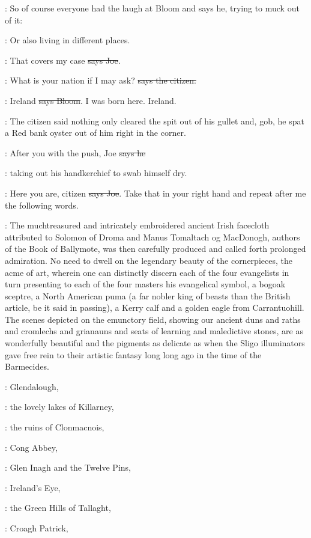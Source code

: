\Nq:
So of course everyone had the laugh at Bloom and says he, trying to
muck out of it:

\Bloom:
Or also living in different places.

\joe:
That covers my case \sout{says Joe}.

\citizen:
What is your nation if I may ask?
\sout{says the citizen.}

\Bloom:
Ireland \sout{says Bloom}.
I was born here. Ireland.

\Nq:
The citizen said nothing only cleared the spit out of his gullet and,
gob, he spat a Red bank oyster out of him right in the corner.

\citizen:
After you with the push, Joe \sout{says he}

\Nq:
taking out his handkerchief to
swab himself dry.

\joe:
Here you are, citizen \sout{says Joe}.
Take that in your right hand and repeat
after me the following words.

:
The muchtreasured and intricately embroidered ancient Irish
facecloth attributed to Solomon of Droma and Manus Tomaltach og
MacDonogh, authors of the Book of Ballymote,
was then carefully
produced and called forth prolonged admiration. No need to dwell on the
legendary beauty of the cornerpieces, the acme of art, wherein one can
distinctly discern each of the four evangelists in turn presenting to each
of the four masters his evangelical symbol, a bogoak sceptre, a North
American puma (a far nobler king of beasts than the British article, be it
said in passing), a Kerry calf and a golden eagle from Carrantuohill. The
scenes depicted on the emunctory field, showing our ancient duns and raths
and cromlechs and grianauns and seats of learning and maledictive stones,
are as wonderfully beautiful and the pigments as delicate as when the
Sligo illuminators gave free rein to their artistic fantasy
long long ago
in the time of the Barmecides.

:
Glendalough,

:
the lovely lakes of Killarney,

:
the ruins of Clonmacnois,

:
Cong Abbey,

:
Glen Inagh and the Twelve Pins,

:
Ireland's Eye,

:
the Green Hills of Tallaght,

:
Croagh Patrick,

